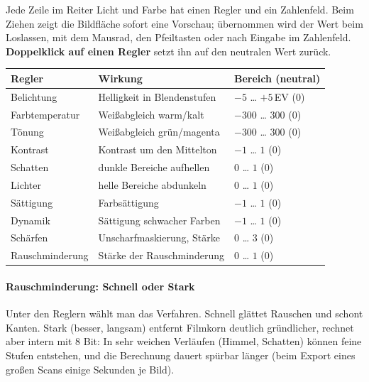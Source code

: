 \documentclass[a4paper,11pt,parskip=half,DIV=12]{scrartcl}
\newcommand{\menu}[1]{\textsf{#1}}                    %
\begin{document}
Jede Zeile im Reiter \menu{Licht und Farbe} hat einen Regler und ein Zahlenfeld. Beim Ziehen zeigt die
Bildfläche sofort eine Vorschau; übernommen wird der Wert beim Loslassen, mit dem Mausrad, den
Pfeiltasten oder nach Eingabe im Zahlenfeld. \textbf{Doppelklick auf einen Regler} setzt ihn auf
den neutralen Wert zurück.

\begin{center}
\begin{tabularx}{\textwidth}{@{}lXl@{}}
  \toprule
  Regler & Wirkung & Bereich (neutral) \\
  \midrule
  Belichtung      & Helligkeit in Blendenstufen                 & $-5$ … $+5$\,EV (0) \\
  Farbtemperatur  & Weißabgleich warm/kalt                      & $-300$ … $300$ (0) \\
  Tönung          & Weißabgleich grün/magenta                   & $-300$ … $300$ (0) \\
  Kontrast        & Kontrast um den Mittelton                   & $-1$ … $1$ (0) \\
  Schatten          & dunkle Bereiche aufhellen                   & $0$ … $1$ (0) \\
  Lichter         & helle Bereiche abdunkeln                    & $0$ … $1$ (0) \\
  Sättigung       & Farbsättigung                               & $-1$ … $1$ (0) \\
  Dynamik         & Sättigung schwacher Farben                  & $-1$ … $1$ (0) \\
  Schärfen        & Unscharfmaskierung, Stärke                  & $0$ … $3$ (0) \\
  Rauschminderung & Stärke der Rauschminderung                  & $0$ … $1$ (0) \\
  \bottomrule
\end{tabularx}
\end{center}

\paragraph{Rauschminderung: Schnell oder Stark} Unter den Reglern wählt man das Verfahren.
\menu{Schnell} glättet Rauschen und schont Kanten. \menu{Stark (besser, langsam)} entfernt Filmkorn
deutlich gründlicher, rechnet aber intern mit 8 Bit: In sehr weichen Verläufen (Himmel, Schatten)
können feine Stufen entstehen, und die Berechnung dauert spürbar länger (beim Export eines
großen Scans einige Sekunden je Bild).
\end{document}
